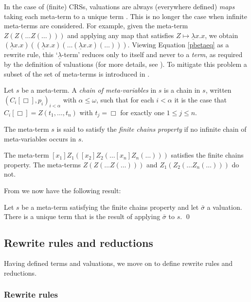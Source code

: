 \documentclass{LMCS}
\theoremstyle{plain}
\theoremstyle{definition}
\newcommand{\ulam}{\underline{\lambda}}
\begin{document}
In the case of (finite) CRSs, valuations are always (everywhere defined) \emph{maps} taking each meta-term to a unique term \cite[Remark II.1.10.1]{K80}. This is no longer the case when infinite meta-terms are considered. For example, given the meta-term $Z(Z(\ldots Z(\ldots)))$ and applying any map that satisfies $Z \mapsto \ulam x.x$, we obtain $(\ulam x. x)((\ulam x. x)(\ldots (\ulam x. x)(\ldots)))$. Viewing Equation \eqref{pbetaeq} as a rewrite rule, this `$\ulam$-term' reduces only to itself and never to a \emph{term}, as required by the definition of valuations (for more details, see \cite{JJ05a}). To mitigate this problem a subset of the set of meta-terms is introduced in \cite{JJ05a}.
\begin{defi}
Let $s$ be a meta-term.  A \emph{chain of meta-variables} in $s$ is a chain in $s$, written $(C_i[\Box],p_i)_{i < \alpha}$ with $\alpha \leq \omega$, such that for each $i < \alpha$ it is the case that $C_i[\Box] = Z(t_1, \ldots, t_n)$ with $t_j = \Box$ for exactly one $1 \leq j \leq n$.

The meta-term $s$ is said to satisfy the \emph{finite chains property} if no infinite chain of meta-variables occurs in $s$.
\end{defi}

\begin{exa}
\label{ex:chain}
The meta-term $[x_1]Z_1([x_2]Z_2(\ldots [x_n]Z_n(\ldots)))$ satisfies the finite chains property. The meta-terms $Z(Z(\ldots Z(\ldots)))$ and $Z_1(Z_2(\ldots Z_n(\ldots)))$ do not.
\end{exa}

From \cite{JJ05a} we now have the following result:
\begin{prop}
\label{prop:metasane}
Let $s$ be a meta-term satisfying the finite chains property and
let $\bar{\sigma}$ a valuation. There is a unique term that is the
result of applying $\bar{\sigma}$ to $s$. \qed
\end{prop}

\subsection{Rewrite rules and reductions}
\label{sec:rules}

Having defined terms and valuations, we move on to define rewrite rules and reductions.

\subsubsection{Rewrite rules}
\end{document}
